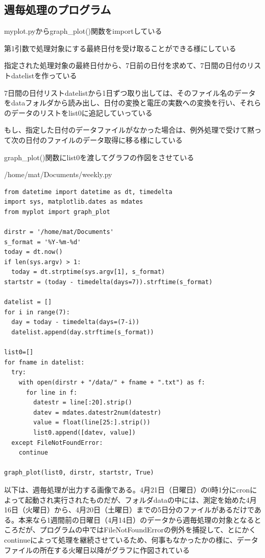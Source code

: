 \documentclass[12pt,a4paper,uplatex]{jsarticle}
\begin{document}
\subsection{週毎処理のプログラム}

	myplot.pyからgraph\_plot()関数をimportしている
	
	第1引数で処理対象にする最終日付を受け取ることができる様にしている
	
	指定された処理対象の最終日付から、7日前の日付を求めて、7日間の日付のリストdatelistを作っている
	
	7日間の日付リストdatelistから1日ずつ取り出しては、そのファイル名のデータをdataフォルダから読み出し、日付の変換と電圧の実数への変換を行い、それらのデータのリストをlist0に追記していっている
	
	もし、指定した日付のデータファイルがなかった場合は、例外処理で受けて黙って次の日付のファイルのデータ取得に移る様にしている
	
	graph\_plot()関数にlist0を渡してグラフの作図をさせている

\begin{itembox}[l]{/home/mat/Documents/weekly.py}
	\begin{verbatim}
from datetime import datetime as dt, timedelta
import sys, matplotlib.dates as mdates
from myplot import graph_plot

dirstr = '/home/mat/Documents'
s_format = '%Y-%m-%d'
today = dt.now()
if len(sys.argv) > 1:
  today = dt.strptime(sys.argv[1], s_format)
startstr = (today - timedelta(days=7)).strftime(s_format)

datelist = []
for i in range(7):
  day = today - timedelta(days=(7-i))
  datelist.append(day.strftime(s_format))

list0=[]
for fname in datelist:
  try:
    with open(dirstr + "/data/" + fname + ".txt") as f:
      for line in f:
        datestr = line[:20].strip()
        datev = mdates.datestr2num(datestr)
        value = float(line[25:].strip())
        list0.append([datev, value])
  except FileNotFoundError:
    continue

graph_plot(list0, dirstr, startstr, True)
	\end{verbatim}
\end{itembox}

\newpage

以下は、週毎処理が出力する画像である。4月21日（日曜日）の0時1分にcronによって起動され実行されたものだが、フォルダdataの中には、測定を始めた4月16日（火曜日）から、4月20日（土曜日）までの5日分のファイルがあるだけである。本来なら1週間前の日曜日（4月14日）のデータから週毎処理の対象となるところだが、プログラムの中ではFileNotFoundErrorの例外を捕捉して、とにかくcontinueによって処理を継続させているため、何事もなかったかの様に、データファイルの所在する火曜日以降がグラフに作図されている
\end{document}
